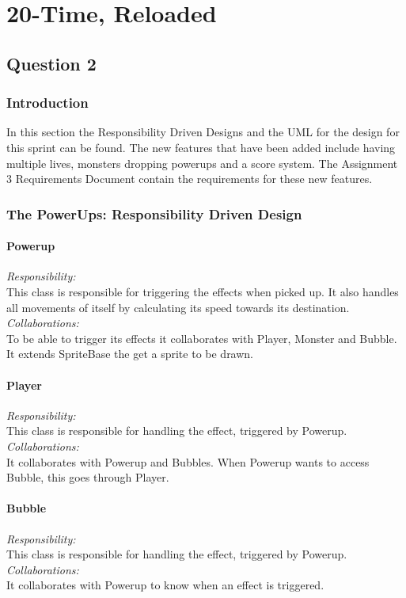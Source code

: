 \chapter{20-Time, Reloaded}

\section{Question 2}

\subsection{Introduction}
In this section the Responsibility Driven Designs and the UML for the design for this sprint can be found. The new features that have been added include having multiple lives, monsters dropping powerups and a score system. The Assignment 3 Requirements Document contain the requirements for these new features.

\subsection{The PowerUps: Responsibility Driven Design}
\subsubsection{Powerup}
\textit{Responsibility:} \\
This class is responsible for triggering the effects when picked up. It also handles all movements of itself by calculating its speed towards its destination. \\
\textit{Collaborations:} \\
To be able to trigger its effects it collaborates with Player, Monster and Bubble. It extends SpriteBase the get a sprite to be drawn.

\subsubsection{Player}
\textit{Responsibility:} \\
This class is responsible for handling the effect, triggered by Powerup. \\
\textit{Collaborations:} \\
It collaborates with Powerup and Bubbles. When Powerup wants to access Bubble, this goes through Player.

\subsubsection{Bubble}
\textit{Responsibility:} \\
This class is responsible for handling the effect, triggered by Powerup. \\
\textit{Collaborations:} \\
It collaborates with Powerup to know when an effect is triggered. 

